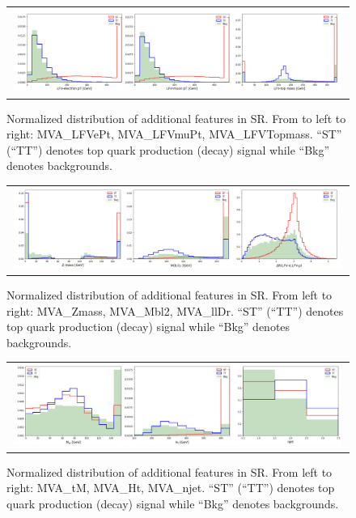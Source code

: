 \begin{figure}[tbh!]
 \begin{center}
 \begin{tabular}{c}
 \includegraphics[width=0.99\textwidth]{figures/Part3/BDT/Features2}\\
 \end{tabular}
 \caption{Normalized distribution of additional features in SR. From to left to right: MVA\_LFVePt, MVA\_LFVmuPt, MVA\_LFVTopmass. ``ST'' (``TT'') denotes top quark production (decay) signal while ``Bkg'' denotes backgrounds.}
 \label{fig:Features2}
 \end{center}
\end{figure}

\begin{figure}[tbh!]
 \begin{center}
 \begin{tabular}{c}
 \includegraphics[width=0.99\textwidth]{figures/Part3/BDT/Features3}\\
 \end{tabular}
 \caption{Normalized distribution of additional features in SR. From left to right: MVA\_Zmass, MVA\_Mbl2, MVA\_llDr. ``ST'' (``TT'') denotes top quark production (decay) signal while ``Bkg'' denotes backgrounds.}
 \label{fig:Features3}
 \end{center}
\end{figure}

\begin{figure}[tbh!]
 \begin{center}
 \begin{tabular}{c}
 \includegraphics[width=0.99\textwidth]{figures/Part3/BDT/Features4}\\
 \end{tabular}
 \caption{Normalized distribution of additional features in SR. From left to right: MVA\_tM, MVA\_Ht, MVA\_njet. ``ST'' (``TT'') denotes top quark production (decay) signal while ``Bkg'' denotes backgrounds.}
 \label{fig:Features4}
 \end{center}
\end{figure}

